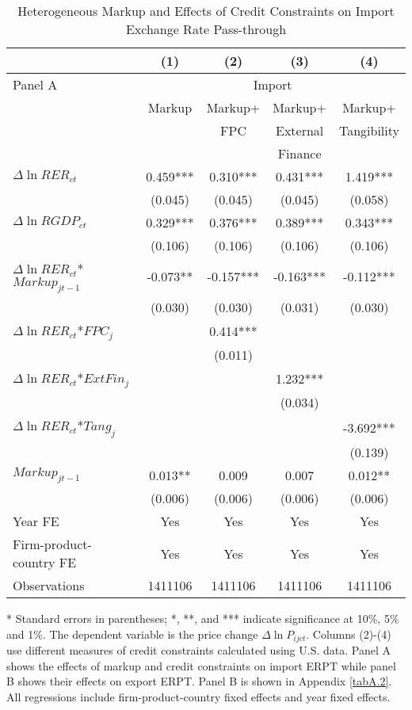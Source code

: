 \begin{table}[htbp]
	\centering
	\caption{Heterogeneous Markup and Effects of Credit Constraints on Import Exchange Rate Pass-through}
	\begin{threeparttable}
		\begin{tabular}{lcccc}
			\midrule          & (1)   & (2)   & (3)   & (4)     \\
			\midrule
			Panel A & \multicolumn{4}{c}{Import} \\
			& Markup & Markup+& Markup+ & Markup+      \\
			&       &FPC& External & Tangibility        \\
			&       & & Finance &  	          \\
			\midrule
			$\Delta \ln RER_{ct}$ & 0.459*** & 0.310*** & 0.431*** & 1.419***   \\
			& (0.045) & (0.045) & (0.045) & (0.058) \\
			$\Delta \ln RGDP_{ct}$ & 0.329*** & 0.376*** & 0.389*** & 0.343*** \\
			& (0.106) & (0.106) & (0.106) & (0.106)  \\
			$\Delta \ln RER_{ct}$*$Markup_{jt-1}$ & -0.073** & -0.157*** & -0.163*** & -0.112*** \\
			& (0.030) & (0.030) & (0.031) & (0.030) \\
			$\Delta \ln RER_{ct}$*$FPC_{j}$ &       & 0.414*** &       &  \\
			&       & (0.011) &       &   \\
			$\Delta \ln RER_{ct}$*$ExtFin_{j}$ &       &       & 1.232*** &  \\
			&       &       & (0.034) &   \\
			$\Delta \ln RER_{ct}$*$Tang_{j}$  &       &       &       & -3.692*** \\
			&       &       &       & (0.139) \\
			$Markup_{jt-1}$ & 0.013** & 0.009 & 0.007 & 0.012**  \\
			& (0.006) & (0.006) & (0.006) & (0.006)  \\
			Year FE  & Yes   & Yes   & Yes   & Yes       \\
			Firm-product-country FE & Yes   & Yes   & Yes   & Yes       \\
			Observations & 1411106 & 1411106 & 1411106 & 1411106  \\
			\bottomrule
		\end{tabular}
		\begin{tablenotes}
			\footnotesize
			\item[*] Standard errors in parentheses; *, **, and *** indicate significance at 10\%, 5\% and 1\%. The dependent variable is the price change $\Delta \ln P_{ijct}$. Columns (2)-(4) use different measures of credit constraints calculated using U.S. data. Panel A shows the effects of markup and credit constraints on import ERPT while panel B shows their effects on export ERPT. Panel B is shown in Appendix \ref{tabA.2}. All regressions include firm-product-country fixed effects and year fixed effects.
		\end{tablenotes}
	\end{threeparttable}
	\label{tab6.1}
\end{table}

